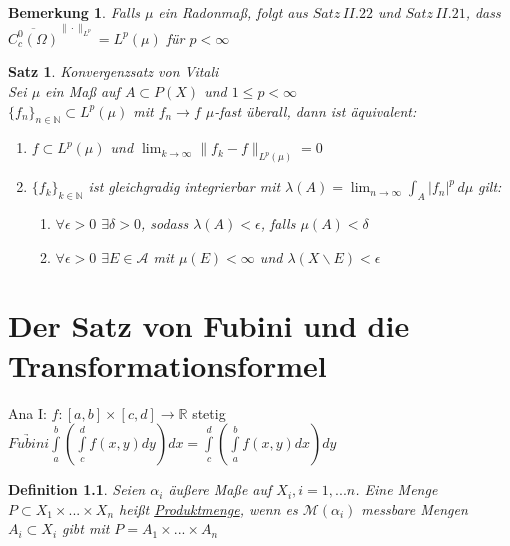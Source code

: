 \documentclass[11pt]{memoir}
\theoremstyle{changebreak}
\newtheorem{Definition}{Definition}[chapter]
\newtheorem{Bemerkung}{Bemerkung}[chapter]
\newtheorem{Satz}{Satz}[chapter]
\begin{document}
\begin{Bemerkung}
Falls $\mu$ ein Radonmaß, folgt aus $Satz \, II.22$ und $Satz \,  II.21$, dass $\overline{C^0_c (\Omega)}^{\|\cdotp\|_{L^p}} = L^p (\mu)$ für $p < \infty$
\end{Bemerkung}

\begin{Satz}
\emph{Konvergenzsatz von Vitali} \\
Sei $\mu$ ein Maß auf $A \subset P(X)$ und $1 \leq p < \infty$ \\
$\{f_n\}_{n \in \mathbb N} \subset L^p(\mu)$ mit $f_n \rightarrow f$ $\mu$-fast überall, dann ist äquivalent:
\begin{enumerate}
	\item $f \subset L^p(\mu)$ und $\lim_{k \rightarrow \infty} \|f_k -f \|_{L^p (\mu)} = 0$
	\item $\{f_k\}_{k \in \mathbb N}$ ist gleichgradig integrierbar mit $\lambda(A) = \lim_{n \rightarrow \infty} \int_A |f_n|^p \, d\mu$ gilt:
	\begin{enumerate}
		\item $\forall \epsilon > 0$ $\exists \delta > 0$, sodass $\lambda(A) < \epsilon$, falls $\mu(A) < \delta$
		\item $\forall \epsilon > 0$ $\exists E \in \mathscr A$ mit $\mu(E) < \infty$ und $\lambda(X \backslash E) < \epsilon$
	\end{enumerate}
\end{enumerate}

\end{Satz}






\newpage
\chapter{Der Satz von Fubini und die Transformationsformel}
Ana I: $f: [a, b] \times [c, d] \rightarrow \mathbb R$ stetig \\
$\underrightarrow{Fubini} \int\limits_a^b \left( \int\limits_c^d f(x, y) dy\right) dx = \int\limits_c^d \left( \int\limits_a^b f(x, y) dx \right) dy$

\begin{Definition}
Seien $\alpha_i$ äußere Maße auf $X_i, i = 1, ... n$. Eine Menge $P \subset X_1 \times ... \times X_n$ heißt \underline{Produktmenge}, wenn es $\mathscr M(\alpha_i)$ messbare Mengen $A_i \subset X_i$ gibt mit $P = A_1 \times ... \times A_n$
\end{Definition}
\end{document}
